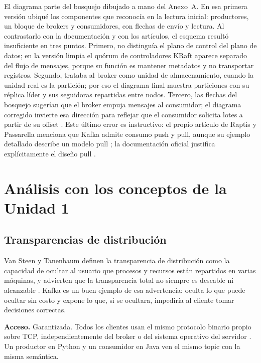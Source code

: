 \documentclass[11pt,a4paper]{article}
\begin{document}
El diagrama parte del bosquejo dibujado a mano del Anexo~A. En esa primera versión ubiqué los componentes que reconocía en la lectura inicial: productores, un bloque de brokers y consumidores, con flechas de envío y lectura. Al contrastarlo con la documentación y con los artículos, el esquema resultó insuficiente en tres puntos. Primero, no distinguía el plano de control del plano de datos; en la versión limpia el quórum de controladores KRaft aparece separado del flujo de mensajes, porque su función es mantener metadatos y no transportar registros. Segundo, trataba al broker como unidad de almacenamiento, cuando la unidad real es la partición; por eso el diagrama final muestra particiones con su réplica líder y sus seguidoras repartidas entre nodos. Tercero, las flechas del bosquejo sugerían que el broker empuja mensajes al consumidor; el diagrama corregido invierte esa dirección para reflejar que el consumidor solicita lotes a partir de su offset \cite{raptis2023survey,kafkadocs}. Este último error es instructivo: el propio artículo de Raptis y Passarella menciona que Kafka admite consumo push y pull, aunque su ejemplo detallado describe un modelo pull \cite{raptis2023survey}; la documentación oficial justifica explícitamente el diseño pull \cite{kafkadocs}.

\section{Análisis con los conceptos de la Unidad 1}

\subsection{Transparencias de distribución}
\label{sec:transparencias}

Van Steen y Tanenbaum definen la transparencia de distribución como la capacidad de ocultar al usuario que procesos y recursos están repartidos en varias máquinas, y advierten que la transparencia total no siempre es deseable ni alcanzable \cite{vansteen2023distributed}. Kafka es un buen ejemplo de esa advertencia: oculta lo que puede ocultar sin costo y expone lo que, si se ocultara, impediría al cliente tomar decisiones correctas.

\textbf{Acceso.} Garantizada. Todos los clientes usan el mismo protocolo binario propio sobre TCP, independientemente del broker o del sistema operativo del servidor \cite{calderon2024monitoring,kafkadocs}. Un productor en Python y un consumidor en Java ven el mismo topic con la misma semántica.
\end{document}

